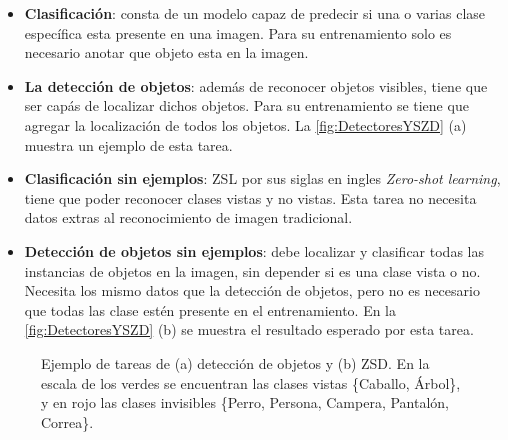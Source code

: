 \begin{itemize}
	\item \textbf{Clasificación}: consta de un modelo capaz de predecir si una  o varias clase específica esta presente en una imagen. Para su entrenamiento solo es necesario anotar que objeto esta en la imagen.
	\item \textbf{La detección de objetos}: además de reconocer objetos visibles, tiene que ser capás de localizar dichos objetos. Para su entrenamiento se tiene que agregar la localización de todos los objetos. La \autoref{fig:DetectoresYSZD} (a) muestra un ejemplo de esta tarea.
	\item \textbf{Clasificación sin ejemplos}: ZSL por sus siglas en ingles \textit{Zero-shot learning}, tiene que poder reconocer clases vistas y no vistas. Esta tarea no necesita datos extras al reconocimiento de imagen tradicional. 
	\item \textbf{Detección de objetos sin ejemplos}: debe localizar y clasificar todas las instancias de objetos en la imagen, sin depender si es una clase vista o no. Necesita los mismo datos que la detección de objetos, pero no es necesario que todas las clase estén presente en el entrenamiento. En la \autoref{fig:DetectoresYSZD} (b) se muestra el resultado esperado por esta tarea.
\end{itemize}

\begin{figure}[]
	\centering
	\caption{Ejemplo de tareas de (a) detección de objetos y (b) ZSD. En la escala de los verdes se encuentran las clases vistas \{Caballo, Árbol\}, y en rojo las clases invisibles \{Perro, Persona, Campera, Pantalón, Correa\}.}
	\label{fig:DetectoresYSZD}
\end{figure}


